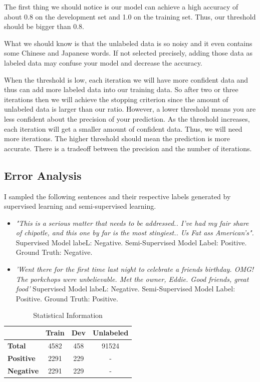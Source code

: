 The first thing we should notice is our model can achieve a high accuracy of about 0.8 on the development set and  1.0 on the training set. Thus, our threshold should be bigger than 0.8.

What we should know is that the unlabeled data is so noisy and it even contains some Chinese and Japanese words. If not selected precisely, adding those data as labeled data may confuse your model and decrease the accuracy.

When the threshold is low, each iteration we will have more confident data and thus can add more labeled data into our training data. So after two or three iterations then we will achieve the stopping criterion since the amount of unlabeled data is larger than our ratio. However, a lower threshold means you are less confident about the precision of your prediction. As the threshold increases, each iteration will get a smaller amount of confident data. Thus, we will need more iterations. The higher threshold should mean the prediction is more accurate. There is a tradeoff between the precision and the number of iterations. 

\subsection{\textbf{Error Analysis}}

I sampled the following sentences and their respective labels generated by supervised learning and semi-supervised learning. 

\begin{itemize}
\item \textit{"This is a serious matter that needs to be addressed.. I've had my fair share of chipotle, and this one by far is the most stingiest.. Us Fat ass American's".} Supervised Model labeL: Negative. Semi-Supervised Model Label: Positive. Ground Truth: Negative.
\item \textit{'Went there for the first time last night to celebrate a friends birthday.  OMG!  The porkchops were unbelievable. Met the owner, Eddie.  Good friends, great food'} Supervised Model labeL: Negative. Semi-Supervised Model Label: Positive. Ground Truth: Positive.
\end{itemize}

\begin{table}[ht]  %
\centering  %
\caption{Statistical Information}
\begin{tabular}{lccc}
\hline
&    \textbf{Train} & \textbf{Dev} & \textbf{Unlabeled} \\
\hline
 \textbf{Total} & 4582 & 458 & 91524 \\
 \textbf{Positive}   & 2291 &  229 &  -   \\
 \textbf{Negative} &  2291 &  229  &  -  \\
\hline
\end{tabular}
\label{tab:stat}
\end{table}

